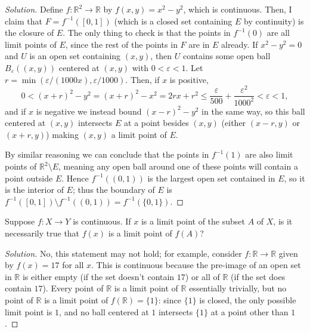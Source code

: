 \documentclass[10pt]{article}
\providecommand{\eps}{\varepsilon}
\providecommand{\RR}{\mathbb R}
\providecommand{\inv}{^{-1}}
\newenvironment{soln}{\begin{proof}[Solution]}{\end{proof}}
\begin{document}
\begin{soln}
    Define $f\colon\RR^2\to\RR$ by $f(x,y) = x^2 - y^2$,
    which is continuous.
    Then, I claim that $F = f\inv([0,1])$ (which is a closed set containing $E$
    by continuity) is the closure of $E$.
    The only thing to check is that the points in $f\inv(0)$
    are all limit points of $E$, since the rest of the points
    in $F$ are in $E$ already. If $x^2-y^2=0$
    and $U$ is an open set containing $(x,y)$, then $U$ contains
    some open ball $B_\eps((x,y))$ centered at $(x,y)$ with $0 < \eps < 1$.
    Let $r = \min(\eps/(1000x), \eps/1000)$. Then, if $x$ is positive,
    \begin{equation*}
	0 < (x+r)^2 - y^2 = (x+r)^2 - x^2 = 2rx + r^2
	\le \frac{\eps}{500} + \frac{\eps^2}{1000^2} < \eps < 1,
    \end{equation*}
    and if $x$ is negative we instead bound $(x-r)^2 - y^2$ in the same way,
    so this ball centered at $(x,y)$ intersects $E$ at a point besides $(x,y)$
    (either $(x-r,y)$ or $(x+r,y)$) making $(x,y)$ a limit point of $E$.

    By similar reasoning we can conclude that the points in $f\inv(1)$
    are also limit points of $\RR^2\setminus E$, meaning any open ball
    around one of these points will contain a point outside $E$.
    Hence $f\inv((0,1))$ is the largest open set contained in $E$,
    so it is the interior of $E$; thus the boundary of $E$ is
    $f\inv([0,1])\setminus f\inv((0,1)) = f\inv(\{0,1\})$.
\end{soln}

\begin{problem}
    [Munkres 18.2]
    Suppose $f\colon X\to Y$ is continuous. If $x$ is a limit point of
    the subset $A$ of $X$, is it necessarily true that
    $f(x)$ is a limit point of $f(A)$?
\end{problem}

\begin{soln}
    No, this statement may not hold; for example,
    consider $f\colon\RR\to\RR$ given by $f(x) = 17$ for all $x$.
    This is continuous because the pre-image of an open set in $\RR$
    is either empty (if the set doesn't contain $17$)
    or all of $\RR$ (if the set does contain $17$).
    Every point of $\RR$ is a limit point of $\RR$ essentially trivially,
    but no point of $\RR$ is a limit point of $f(\RR) = \{1\}$:
    since $\{1\}$ is closed, the only possible limit point is $1$,
    and no ball centered at $1$ intersects $\{1\}$ at a point other than $1$.
\end{soln}
\end{document}
